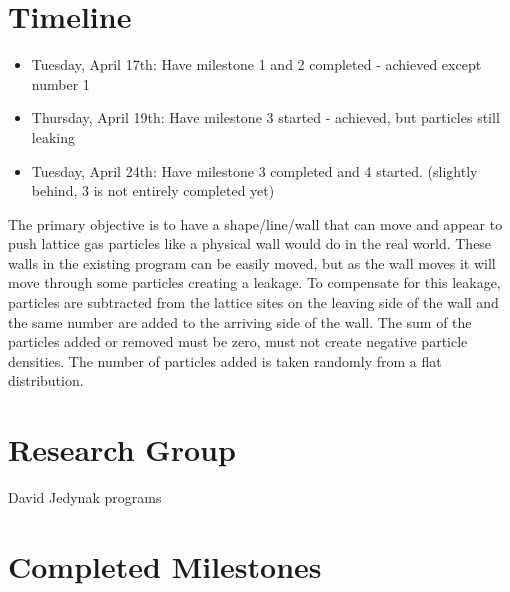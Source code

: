 \documentclass{article}
\begin{document}
\section{Timeline}
\begin{itemize}
  \item Tuesday, April 17th: Have milestone 1 and 2 completed - achieved except number 1
  \item Thursday, April 19th: Have milestone 3 started - achieved, but particles still leaking
  \item Tuesday, April 24th: Have milestone 3 completed and 4 started. (slightly behind, 3 is not entirely completed yet)
\end{itemize}
The primary objective is to have a shape/line/wall that can move and appear to push lattice gas particles like a physical wall would do in the real world. These walls in the existing program can be easily moved, but as the wall moves it will move through some particles creating a leakage. To compensate for this leakage, particles are subtracted from the lattice sites on the leaving side of the wall and the same number are added to the arriving side of the wall. The sum of the particles added or removed must be zero, must not create negative particle densities. The number of particles added is taken randomly from a flat distribution. 
\section{Research Group}
David Jedynak programs 
\section{Completed Milestones}
\end{document}
